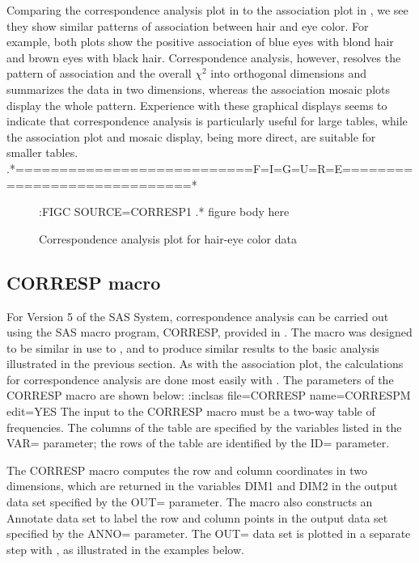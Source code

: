 Comparing the correspondence analysis plot in
 to the association plot
in , we see they show similar patterns of
association between hair and eye color.
For example, both plots show the positive association of
blue eyes with blond hair and brown eyes with black hair.
Correspondence analysis,
however, resolves the pattern of association and the overall
\(\chi^2\)
into orthogonal dimensions
and summarizes the data in two dimensions, whereas the association
mosaic plots display the whole pattern.
Experience with these graphical displays seems to indicate that correspondence analysis is
particularly useful for large tables, while the association
plot and mosaic display, being more direct, are suitable for
smaller tables.
.*===========================F=I=G=U=R=E=============================*
\begin{figure}\label{cahair2}
:FIGC SOURCE=CORRESP1
.* figure body here
\caption{Correspondence analysis plot for hair-eye color data}
\end{figure}

\subsection{CORRESP macro}
For Version 5 of the SAS System, correspondence analysis can be carried out using
the SAS macro program, CORRESP, provided in
.
The macro was designed to be similar in use to ,
and to produce similar results to the basic analysis
illustrated in the previous section.
As with the association plot, the calculations for correspondence
analysis are done most easily with .
The parameters of the CORRESP macro are shown below:
:inclsas file=CORRESP name=CORRESPM edit=YES
The input to the CORRESP macro
must be a two-way table of frequencies.
The columns of the table are specified by the variables
listed in the VAR= parameter; the rows of the table are identified
by the ID= parameter.


The CORRESP macro computes the row and column coordinates
in two dimensions, which are returned in the variables DIM1 and DIM2
in the output data set specified by the OUT= parameter.  The macro also
constructs an Annotate data set to label the row and column points in the
output data set specified by the ANNO= parameter.
The OUT= data set is plotted in a separate step with ,
as illustrated in the examples below.

